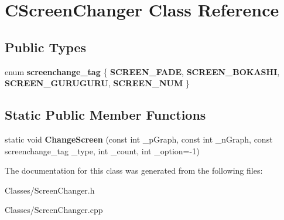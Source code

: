 \hypertarget{class_c_screen_changer}{}\section{C\+Screen\+Changer Class Reference}
\label{class_c_screen_changer}
\subsection*{Public Types}
\begin{DoxyCompactItemize}
\item 
enum {\bfseries screenchange\+\_\+tag} \{ {\bfseries S\+C\+R\+E\+E\+N\+\_\+\+F\+A\+DE}, 
{\bfseries S\+C\+R\+E\+E\+N\+\_\+\+B\+O\+K\+A\+S\+HI}, 
{\bfseries S\+C\+R\+E\+E\+N\+\_\+\+G\+U\+R\+U\+G\+U\+RU}, 
{\bfseries S\+C\+R\+E\+E\+N\+\_\+\+N\+UM}
 \}\hypertarget{class_c_screen_changer_a8188a4717947ff55d37a920c36d197fc}{}\label{class_c_screen_changer_a8188a4717947ff55d37a920c36d197fc}

\end{DoxyCompactItemize}
\subsection*{Static Public Member Functions}
\begin{DoxyCompactItemize}
\item 
static void {\bfseries Change\+Screen} (const int \+\_\+p\+Graph, const int \+\_\+n\+Graph, const screenchange\+\_\+tag \+\_\+type, int \+\_\+count, int \+\_\+option=-\/1)\hypertarget{class_c_screen_changer_a95a7d23f355e888644665b848ba92eab}{}\label{class_c_screen_changer_a95a7d23f355e888644665b848ba92eab}

\end{DoxyCompactItemize}


The documentation for this class was generated from the following files\+:\begin{DoxyCompactItemize}
\item 
Classes/Screen\+Changer.\+h\item 
Classes/Screen\+Changer.\+cpp\end{DoxyCompactItemize}
